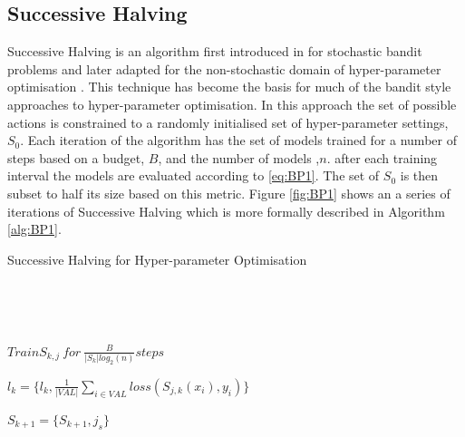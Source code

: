 \documentclass{article}
\begin{document}
	\subsection{Successive Halving}

	Successive Halving is an algorithm first introduced in \cite{SH0} for stochastic bandit problems and later adapted for the non-stochastic domain of hyper-parameter optimisation \cite{SH}. This technique has become the basis for much of the bandit style approaches to hyper-parameter optimisation. In this approach the set of possible actions is constrained to a randomly initialised set of hyper-parameter settings, \(S_0\).
	Each iteration of the algorithm has the set of models trained for a number of steps based on a budget, \(B\), and the number of models ,\(n\). after each training interval the models are evaluated according to \ref{eq:BP1}. The set of \(S_0\) is then subset to half its size based on this metric. Figure \ref{fig:BP1} shows an a series of iterations of Successive Halving which is more formally described in Algorithm \ref{alg:BP1}.


	\par
	

		\begin{algorithm}[H]\label{alg:BP1}
			\caption{Successive Halving for Hyper-parameter Optimisation}

			\SetAlgoLined
			\
			
			
			\

				{

					{
					\(Train S_{k,j} ~for~ \frac{B}{|S_k|log_2(n)} steps\)\;

					\(l_{k} = \{l_k,\frac{1}{|VAL|} \sum_{i \in VAL} loss(S_{j,k}(x_i),y_i)\}\) \;
					

					}


					{
						{

						\(S_{k+1} = \{S_{k+1},j_s\}\)\;

						}

			
			  		}
			
				}		
		\end{algorithm}
\end{document}
